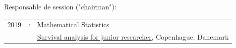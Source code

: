 \documentclass[12pt]{article}
\begin{document}
\bigskip

Responsable de session ("chairman"):

\medskip

\begin{tabular}{l@{ }l@{ }l}
2019 &:& Mathematical Statistics \\
&& \href{https://publicifsv.sund.ku.dk/~safjr2019/}{Survival analysis for junior researcher}, Copenhague, Danemark
\end{tabular}



\end{document}
